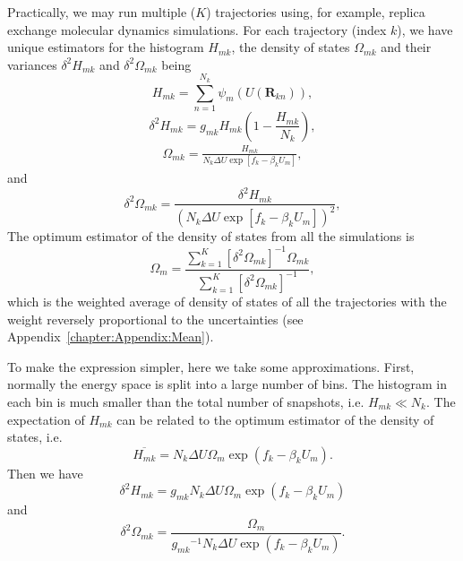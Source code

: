 Practically, we may run multiple ($K$) trajectories using, for example, replica exchange molecular dynamics simulations. For each trajectory (index $k$), we have unique estimators for the histogram $H_{mk}$, the density of states $\Omega_{mk}$ and their variances $\delta^2 H_{mk}$ and $\delta^2\Omega_{mk}$ being
\begin{equation}
	H_{mk}=\sum\limits_{n=1}^{N_k}\psi_{m}(U(\mathbf{R}_{kn})),
\end{equation}
\begin{equation}
	\delta^2 H_{mk}=g_{mk}H_{mk}\left(1-\frac{H_{mk}}{N_k}\right),
\end{equation}
\begin{align}
	\Omega_{mk}=\frac{H_{mk}}{N_k\Delta U\exp{\left[f_k-\beta_kU_{m}\right]}},
	\label{Eq:FEM:WHAM:Omega_mk}
\end{align}
and
\begin{equation}
	\delta^2\Omega_{mk}=\frac{\delta^2 H_{mk}}{\left(N_k\Delta U\exp{\left[f_k-\beta_kU_{m}\right]}\right)^2},
\end{equation}
The optimum estimator of the density of states from all the simulations is
\begin{equation}
	\Omega_m=\frac{\sum\limits_{k=1}^K\left[\delta^2\Omega_{mk}\right]^{-1}\Omega_{mk}}{\sum\limits_{k=1}^K\left[\delta^2\Omega_{mk}\right]^{-1}},
	\label{Eq:FEM:WHAM:optimumOmega}
\end{equation}
which is the weighted average of density of states of all the trajectories with the weight reversely proportional to the uncertainties (see Appendix~\ref{chapter:Appendix:Mean}).

To make the expression simpler, here we take some approximations. First, normally the energy space is split into a large number of bins. The histogram in each bin is much smaller than the total number of snapshots, i.e. $H_{mk}\ll N_k$. The expectation of $H_{mk}$ can be related to the optimum estimator of the density of states, i.e.
\begin{equation}
	\overline{H_{mk}}=N_k\Delta U\Omega_m\exp{(f_k-\beta_kU_m)}.
\end{equation}
Then we have
\begin{equation}
    \delta^2H_{mk}=g_{mk}N_k\Delta U\Omega_m\exp{(f_k-\beta_kU_m)}
    \label{EQ:FEM:WHAM:delta2H_mk}
\end{equation}
and
\begin{equation}
\delta^2\Omega_{mk}=\frac{\Omega_m}{{g_{mk}}^{-1}N_k\Delta U\exp{(f_k-\beta_kU_m)}}.
\label{Eq:FEM:WHAM:delta2Omega_mk}
\end{equation}

